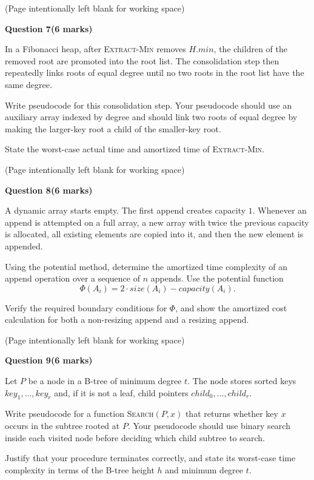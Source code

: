 \documentclass[12pt,letterpaper]{article}
\newcommand{\marksbox}[1]{%
  \vfill
  \begin{flushright}
    \fbox{\parbox[c][1.1cm][c]{1.3cm}{\centering #1}}
  \end{flushright}
}
\newcommand{\questiontitle}[2]{%
  \textbf{Question #1}\hfill\textbf{(#2 marks)}
}
\newcommand{\workingpage}{%
  \newpage
  \begin{center}
    (Page intentionally left blank for working space)
  \end{center}
}
\begin{document}
\marksbox{6}

\workingpage
\newpage

\questiontitle{7}{6}

In a Fibonacci heap, after \textsc{Extract-Min} removes $H.min$, the children
of the removed root are promoted into the root list. The consolidation step
then repeatedly links roots of equal degree until no two roots in the root list
have the same degree.

Write pseudocode for this consolidation step. Your pseudocode should use an
auxiliary array indexed by degree and should link two roots of equal degree by
making the larger-key root a child of the smaller-key root.

State the worst-case actual time and amortized time of \textsc{Extract-Min}.

\marksbox{6}

\workingpage
\newpage

\questiontitle{8}{6}

A dynamic array starts empty. The first append creates capacity $1$. Whenever
an append is attempted on a full array, a new array with twice the previous
capacity is allocated, all existing elements are copied into it, and then the
new element is appended.

Using the potential method, determine the amortized time complexity of an
append operation over a sequence of $n$ appends. Use the potential function
\[
  \Phi(A_i)=2\cdot size(A_i)-capacity(A_i).
\]

Verify the required boundary conditions for $\Phi$, and show the amortized
cost calculation for both a non-resizing append and a resizing append.

\marksbox{6}

\workingpage
\newpage

\questiontitle{9}{6}

Let $P$ be a node in a B-tree of minimum degree $t$. The node stores sorted keys
$key_1,\ldots,key_r$ and, if it is not a leaf, child pointers
$child_0,\ldots,child_r$.

Write pseudocode for a function \textsc{Search}$(P,x)$ that returns whether key
$x$ occurs in the subtree rooted at $P$. Your pseudocode should use binary
search inside each visited node before deciding which child subtree to search.

Justify that your procedure terminates correctly, and state its worst-case time
complexity in terms of the B-tree height $h$ and minimum degree $t$.
\end{document}
